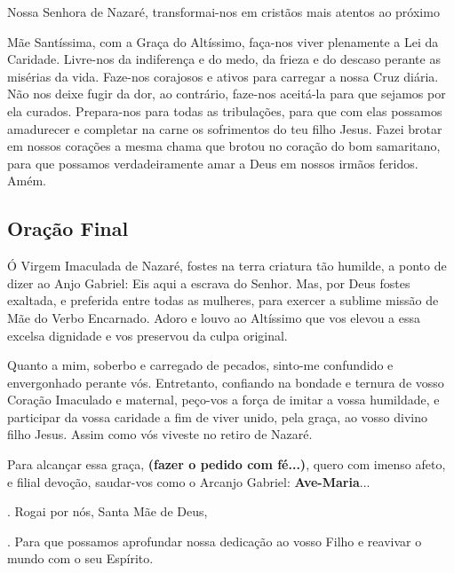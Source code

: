 \documentclass[a4paper,14pt]{extarticle} \usepackage[utf8]{inputenc}
\makeatletter
\newcommand{\vers@resp@sym}{%
  \raisebox{0.2ex}{\rotatebox[origin=c]{-20}{$\m@th\rceil$}}%
}
\newcommand{\vers@resp}[2]{%
  {\ooalign{%
     \hidewidth\kern#1\vers@resp@sym\hidewidth\cr
     #2\cr
  }}%
}
\DeclareRobustCommand{\versicle}{\vers@resp{-0.1em}{V}. \quad}
\DeclareRobustCommand{\response}{\vers@resp{0pt}{R}. \quad}
\makeatother
\begin{document}
Nossa Senhora de Nazaré, transformai-nos em cristãos mais atentos ao próximo

Mãe Santíssima, com a Graça do Altíssimo, faça-nos viver plenamente a Lei da Caridade. Livre-nos da indiferença e do medo, da frieza e do descaso perante as misérias da vida. Faze-nos corajosos e ativos para carregar a nossa Cruz diária. Não nos deixe fugir da dor, ao contrário, faze-nos aceitá-la para que sejamos por ela curados. Prepara-nos para todas as tribulações, para que com elas possamos amadurecer e completar na carne os sofrimentos do teu filho Jesus. Fazei brotar em nossos corações a mesma chama que brotou no coração do bom samaritano, para que possamos verdadeiramente amar a Deus em nossos irmãos feridos. Amém.

\textbf{}

\newpage

\subsection{Oração Final} \label{sec:oracao-final}

Ó Virgem Imaculada de Nazaré, fostes na terra criatura tão humilde, a ponto de dizer ao Anjo Gabriel: Eis aqui a escrava do Senhor. Mas, por Deus fostes exaltada, e preferida entre todas as mulheres, para exercer a sublime missão de Mãe do Verbo Encarnado. Adoro e louvo ao Altíssimo que vos elevou a essa excelsa dignidade e vos preservou da culpa original.

Quanto a mim, soberbo e carregado de pecados, sinto-me confundido e envergonhado perante vós. Entretanto, confiando na bondade e ternura de vosso Coração Imaculado e maternal, peço-vos a força de imitar a vossa humildade, e participar da vossa caridade a fim de viver unido, pela graça, ao vosso divino filho Jesus. Assim como vós viveste no retiro de Nazaré.

Para alcançar essa graça, \textbf{(fazer o pedido com fé...)}, quero com imenso afeto, e filial devoção, saudar-vos como o Arcanjo Gabriel: \textbf{Ave-Maria}...

\response Rogai por nós, Santa Mãe de Deus,

\versicle Para que possamos aprofundar nossa dedicação ao vosso Filho e reavivar o mundo com o seu Espírito. 


\vfill
\end{document}
